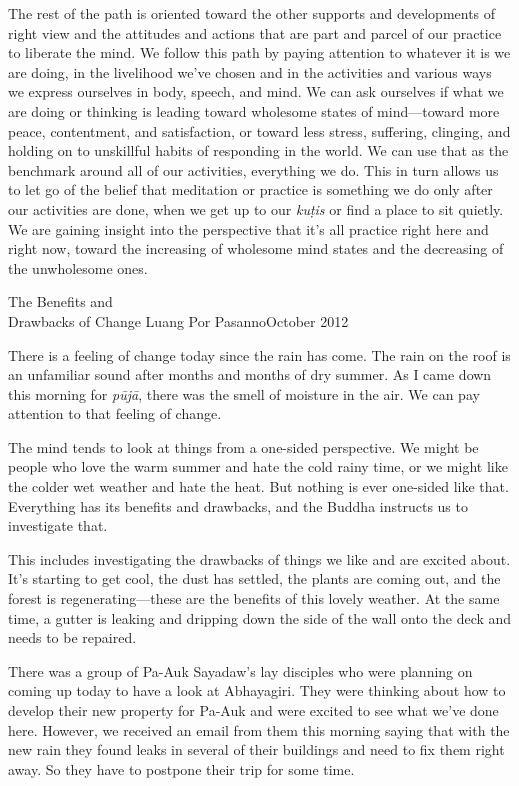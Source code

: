 The rest of the path is oriented toward the other supports and 
developments of right view and the attitudes and actions that are part 
and parcel of our practice to liberate the mind. We follow this path by 
paying attention to whatever it is we are doing, in the livelihood 
we've chosen and in the activities and various ways we express 
ourselves in body, speech, and mind. We can ask ourselves if what we 
are doing or thinking is leading toward wholesome states of 
mind---toward more peace, contentment, and satisfaction, or toward less 
stress, suffering, clinging, and holding on to unskillful habits of 
responding in the world. We can use that as the benchmark around all of 
our activities, everything we do. This in turn allows us to let go of 
the belief that meditation or practice is something we do only after 
our activities are done, when we get up to our \emph{kuṭis} or find a 
place to sit quietly. We are gaining insight into the perspective that 
it's all practice right here and right now, toward the increasing of 
wholesome mind states and the decreasing of the unwholesome ones.

{The Benefits and\\Drawbacks of Change}
{Luang Por Pasanno}{October 2012}

There is a feeling of change today since the rain has come. The rain on 
the roof is an unfamiliar sound after months and months of dry summer. 
As I came down this morning for \emph{pūjā}, there was the smell of 
moisture in the air. We can pay attention to that feeling of change.

The mind tends to look at things from a one-sided perspective. We might 
be people who love the warm summer and hate the cold rainy time, or we 
might like the colder wet weather and hate the heat. But nothing is 
ever one-sided like that. Everything has its benefits and drawbacks, 
and the Buddha instructs us to investigate that.

This includes investigating the drawbacks of things we like and are 
excited about. It's starting to get cool, the dust has settled, the 
plants are coming out, and the forest is regenerating---these are the 
benefits of this lovely weather. At the same time, a gutter is leaking 
and dripping down the side of the wall onto the deck and needs to be 
repaired.

There was a group of Pa-Auk Sayadaw's lay disciples who were planning 
on coming up today to have a look at Abhayagiri. They were thinking 
about how to develop their new property for Pa-Auk and were excited to 
see what we've done here. However, we received an email from them this 
morning saying that with the new rain they found leaks in several of 
their buildings and need to fix them right away. So they have to 
postpone their trip for some time.

